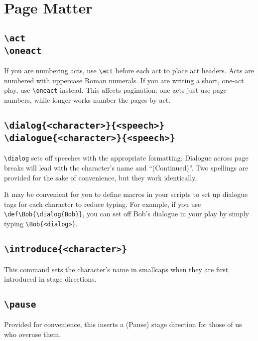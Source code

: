 \documentclass{report}
\begin{document}
\section{Page Matter}

\cprotect\subsection[\verb|\act| \verb|\oneact|]{\verb|\act|\\\verb|\oneact|}

If you are numbering acts, use \verb|\act| before each act to place act headers. Acts are numbered with uppercase Roman numerals. If you are writing a short, one-act play, use \verb|\oneact| instead. This affects pagination: one-acts just use page numbers, while longer works number the pages by act.

\cprotect\subsection[\verb|\dialog{<character>}{<speech>}| \verb|\dialogue{<character>}{<speech>}|]{\verb|\dialog{<character>}{<speech>}|\\\verb|\dialogue{<character>}{<speech>}|}

\verb|\dialog| sets off speeches with the appropriate formatting. Dialogue across page breaks will lead with the character’s name and “(Continued)”. Two spellings are provided for the sake of convenience, but they work identically.

It may be convenient for you to define macros in your scripts to set up dialogue tags for each character to reduce typing. For example, if you use \verb|\def\Bob{\dialog{Bob}}|, you can set off Bob’s dialogue in your play by simply typing \verb|\Bob{<dialog>}|.

\cprotect\subsection{\verb|\introduce{<character>}|}

This command sets the character’s name in smallcaps when they are first introduced in stage directions.

\cprotect\subsection{\verb|\pause|}

Provided for convenience, this inserts a (Pause) stage direction for those of us who overuse them.
\end{document}
